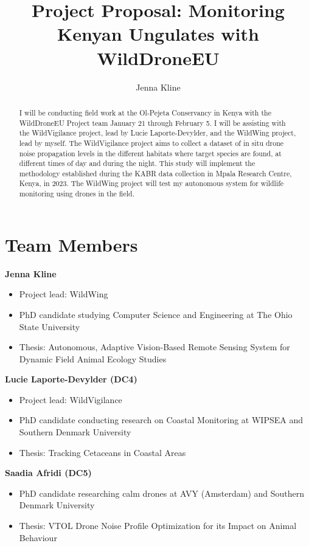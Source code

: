 \documentclass[final,5p,times,twocolumn]{elsarticle}
\begin{document}
\begin{frontmatter}

\title{Project Proposal: Monitoring Kenyan Ungulates with WildDroneEU}
\author[osu]{Jenna Kline}
\address[osu]{Computer Science and Engineering Department, The Ohio State University, Columbus, Ohio, United States}


\begin{abstract}

I will be conducting field work at the Ol-Pejeta Conservancy in Kenya with the WildDroneEU Project team January 21 through February 5.
I will be assisting with the WildVigilance project, lead by Lucie Laporte-Devylder, and the WildWing project, lead by myself.
The WildVigilance project aims to collect a dataset of in situ drone noise propagation levels 
in the different habitats where target species are found, at different times of day and during the night.
This study will implement the methodology established during the KABR data collection in Mpala Research Centre, Kenya, in 2023.
The WildWing project will test my autonomous system for wildlife monitoring using drones in the field.
    
\end{abstract}
\end{frontmatter}

\section{Team Members}
\textbf{Jenna Kline}
\begin{itemize}
    \item Project lead: WildWing
    \item PhD candidate studying Computer Science and Engineering at The Ohio State University
    \item Thesis: Autonomous, Adaptive Vision-Based Remote Sensing System for Dynamic Field Animal Ecology Studies
\end{itemize}

\textbf{Lucie Laporte-Devylder (DC4)}
\begin{itemize}
    \item Project lead: WildVigilance
    \item PhD candidate conducting research on Coastal Monitoring at WIPSEA and Southern Denmark University
    \item Thesis: Tracking Cetaceans in Coastal Areas
\end{itemize}

\textbf{Saadia Afridi (DC5)}
\begin{itemize}
    \item PhD candidate researching calm drones at AVY (Amsterdam) and Southern Denmark University
    \item Thesis: VTOL Drone Noise Profile Optimization for its Impact on Animal Behaviour
\end{itemize}
\end{document}
